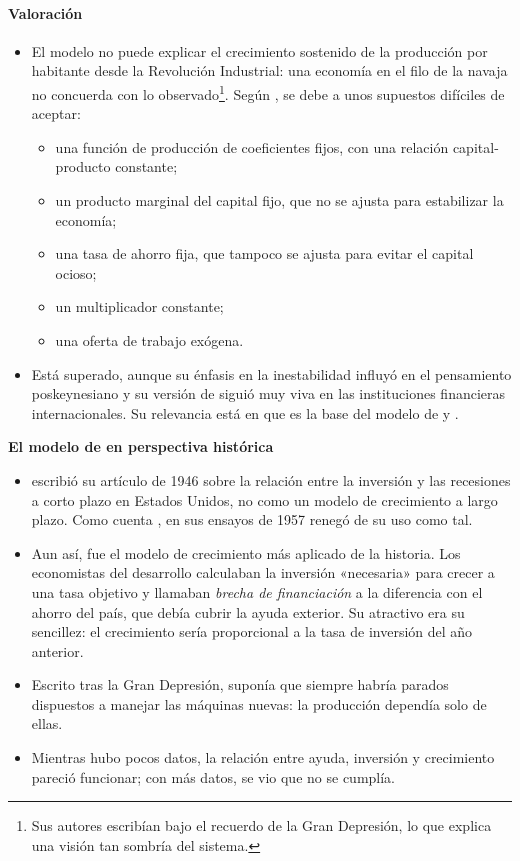 \documentclass[11pt]{article}
\begin{document}
\paragraph{Valoración}

\begin{itemize}
\item El modelo no puede explicar el crecimiento sostenido de la producción por habitante desde la Revolución Industrial: una economía en el filo de la navaja no concuerda con lo observado\footnote{Sus autores escribían bajo el recuerdo de la Gran Depresión, lo que explica una visión tan sombría del sistema.}. Según \textcite[cap.~2]{SalaiMartin2000}, se debe a unos supuestos difíciles de aceptar:
  \begin{itemize}
  \item una función de producción de coeficientes fijos, con una relación capital-producto constante;
  \item un producto marginal del capital fijo, que no se ajusta para estabilizar la economía;
  \item una tasa de ahorro fija, que tampoco se ajusta para evitar el capital ocioso;
  \item un multiplicador constante;
  \item una oferta de trabajo exógena.
  \end{itemize}
\item Está superado, aunque su énfasis en la inestabilidad influyó en el pensamiento poskeynesiano y su versión de  siguió muy viva en las instituciones financieras internacionales. Su relevancia está en que es la base del modelo de  y .
\end{itemize}

\begin{anotaciones}
\textbf{El modelo de  en perspectiva histórica}
\begin{itemize}
\item {} escribió su artículo de 1946 sobre la relación entre la inversión y las recesiones a corto plazo en Estados Unidos, no como un modelo de crecimiento a largo plazo. Como cuenta \textcite[cap.~2]{Easterly2003}, en sus ensayos de 1957 renegó de su uso como tal\nocite{Domar1957Essays}.
\item Aun así, fue el modelo de crecimiento más aplicado de la historia. Los economistas del desarrollo calculaban la inversión «necesaria» para crecer a una tasa objetivo y llamaban \emph{brecha de financiación} a la diferencia con el ahorro del país, que debía cubrir la ayuda exterior. Su atractivo era su sencillez: el crecimiento sería proporcional a la tasa de inversión del año anterior.
\item Escrito tras la Gran Depresión, suponía que siempre habría parados dispuestos a manejar las máquinas nuevas: la producción dependía solo de ellas.
\item Mientras hubo pocos datos, la relación entre ayuda, inversión y crecimiento pareció funcionar; con más datos, se vio que no se cumplía\nocite{Easterly2003}.
\end{itemize}
\end{anotaciones}
\end{document}
